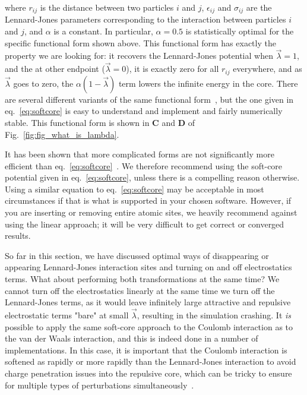 \documentclass[9pt,bestpractices]{livecoms}
\begin{document}
where $r_{ij}$ is the distance between two particles $i$ and $j$, $\epsilon_{ij}$ and $\sigma_{ij}$ are the Lennard-Jones parameters corresponding to the interaction between particles $i$ and $j$, and $\alpha$ is a constant. In particular, $\alpha=0.5$ is statistically optimal for the specific functional form shown above. This functional form has exactly the property we are looking for: it recovers the Lennard-Jones potential when $\vec{\lambda}=1$, and the at other endpoint ($\vec{\lambda}=0$), it is exactly zero for all $r_{ij}$ everywhere, and as $\vec{\lambda}$ goes to zero, the $\alpha(1-\vec{\lambda})$ term lowers the infinite energy in the core. There are several different variants of the same functional form~\cite{zacharias1994separationshifted, beutler1994avoiding,pham2011identifying,Lee_JChemTheoryComput_2020_v16_p5512,Tsai_JChemTheoryComput_2023_v19_p640}, but the one given in eq.~\ref{eq:softcore} is easy to understand and implement and fairly numerically stable. This functional form is shown in \textbf{C} and \textbf{D} of Fig.~\ref{fig:fig_what_is_lambda}.

It has been shown that more complicated forms are not significantly more efficient than eq.~\ref{eq:softcore}~\cite{pham2012optimal}. We therefore recommend using the soft-core potential given in eq.~\ref{eq:softcore}, unless there is a compelling reason otherwise. Using a similar equation to eq.~\ref{eq:softcore} may be acceptable in most circumstances if that is what is supported in your chosen software. However, if you are inserting or removing entire atomic sites, we heavily recommend against using the linear approach; it will be very difficult to get correct or converged results. 

So far in this section, we have discussed optimal ways of disappearing or appearing Lennard-Jones interaction sites and turning on and off electrostatics terms. What about performing both transformations at the same time? We cannot turn off the electrostatics linearly at the same time we turn off the Lennard-Jones terms, as it would leave infinitely large attractive and repulsive electrostatic terms "bare" at small $\vec{\lambda}$, resulting in the simulation crashing. It \textit{is} possible to apply the same soft-core approach to the Coulomb interaction as to the van der Waals interaction, and this is indeed done in a number of implementations. In this case, it is important that the Coulomb interaction is softened as rapidly or more rapidly than the Lennard-Jones interaction to avoid charge penetration issues into the repulsive core, which  can be tricky to ensure for multiple types of perturbations simultaneously~\cite{steinbrecher2011softcore}. 
\end{document}
